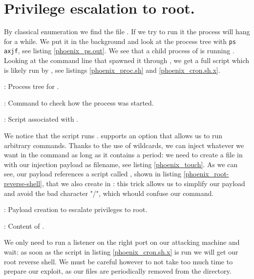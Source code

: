 \section{Privilege escalation to root.}
\par By classical enumeration we find the file . If we try to run it the process will hang for a while. We put it in the background and look at the process tree with \texttt{ps axjf}, see listing \ref{phoenix_ps.out}. We see that a child process of  is running . Looking at the command line that spawned it through , we get a full script which is likely run by , see listings \ref{phoenix_proc.sh} and \ref{phoenix_cron.sh.x}.
\begin{listing}
  \tiny
  
  \caption{: Process tree for .}
  \label{phoenix_ps.out}
\end{listing}
\begin{listing}
  \caption{: Command to check how the  process was started.}
  \label{phoenix_proc.sh}
\end{listing}
\begin{listing}
  \caption{: Script associated with .}
  \label{phoenix_cron.sh.x}
\end{listing}
\par We notice that the script runs .  supports an  option that allows us to run arbitrary commands. Thanks to the use of wildcards, we can inject whatever we want in the command as long as it contains a period: we need to create a file in  with our injection payload as filename, see listing \ref{phoenix_touch}. As we can see, our payload references a script called , shown in listing \ref{phoenix_root-reverse-shell}, that we also create in : this trick allows us to simplify our payload and avoid the bad character "/", which whould confuse our  command.
\begin{listing}
  \caption{: Payload creation to escalate privileges to root.}
  \label{phoenix_touch}
\end{listing}
\begin{listing}
  \caption{: Content of .}
  \label{phoenix_root-reverse-shell}
\end{listing}
\par We only need to run a listener on the right port on our attacking machine and wait: as soon as the script in listing \ref{phoenix_cron.sh.x} is run we will get our root reverse shell. We must be careful however to not take too much time to prepare our exploit, as our files are periodically removed from the directory.
